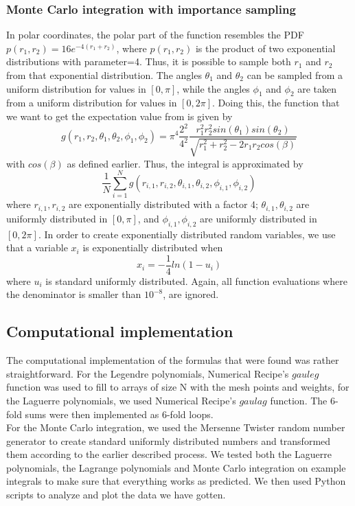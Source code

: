 \documentclass[10pt,a4paper]{article}
\begin{document}
\subsubsection{Monte Carlo integration with importance sampling}
In polar coordinates, the polar part of the function resembles the PDF $p(r_1,r_2)=16e^{-4(r_1+r_2)}$, where $p(r_1,r_2)$ is the product of two exponential distributions with parameter=4. Thus, it is possible to sample both $r_1$ and $r_2$ from that exponential distribution.
The angles $\theta_1$ and $\theta_2$ can be sampled from a uniform distribution for values in $[0,\pi]$, while the angles  $\phi_1$ and $\phi_2$ are taken from a uniform distribution for values in $[0,2\pi]$. Doing this, the function that we want to get the expectation value from is given by
$$g(r_1,r_2,\theta_1,\theta_2,\phi_1,\phi_2)=\pi^4\frac{2^2}{4^2}\frac{r_1^2r_2^2sin(\theta_1)sin(\theta_2)}{\sqrt{r_1^2+r_2^2-2r_1r_2cos(\beta)}}$$
with $cos(\beta)$ as defined earlier.
Thus, the integral is approximated by
$$\frac{1}{N}\sum_{i=1}^{N}g(r_{i,1},r_{i,2},\theta_{i,1},\theta_{i,2},\phi_{i,1},\phi_{i,2})$$
where $r_{i,1},r_{i,2}$ are exponentially distributed with a factor 4;  $\theta_{i,1},\theta_{i,2}$ are uniformly distributed in $[0,\pi]$, and  $\phi_{i,1},\phi_{i,2}$  are uniformly distributed in $[0,2\pi]$. In order to create exponentially distributed random variables, we use that a variable $x_i$ is exponentially distributed when
$$x_i=-\frac{1}{4}ln(1-u_i)$$
where $u_i$ is standard uniformly distributed. Again, all function evaluations where the denominator is smaller than $10^{-8}$, are ignored.
\subsection{Computational implementation}
The computational implementation of the formulas that were found was rather straightforward. For the Legendre polynomials, Numerical Recipe's ${\textit{gauleg}}$ function was used to fill to arrays of size N with the mesh points and weights, for the Laguerre polynomials, we used Numerical Recipe's ${\textit{gaulag}}$ function. The 6-fold sums were then implemented as 6-fold loops.\\
For the Monte Carlo integration, we used the Mersenne Twister random number generator to create standard uniformly distributed numbers and transformed them according to the earlier described process. We tested both the Laguerre polynomials, the Lagrange polynomials and Monte Carlo integration on example integrals to make sure that everything works as predicted. We then used Python scripts to analyze and plot the data we have gotten.
\end{document}
